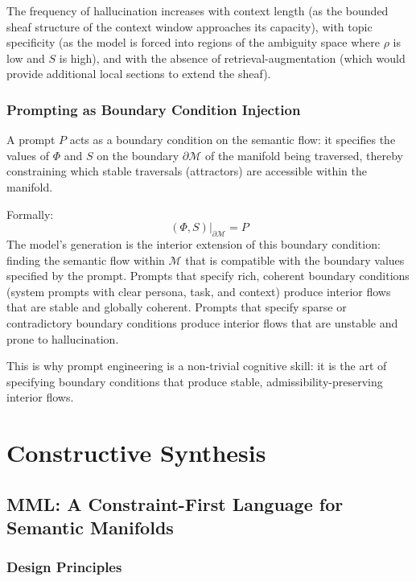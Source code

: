 \documentclass[12pt,oneside]{book}
\theoremstyle{plain}
\theoremstyle{definition}
\theoremstyle{plain}
\newcommand{\cM}{\mathcal{M}}
\begin{document}
The frequency of hallucination increases with context length (as the bounded sheaf structure of the context window approaches its capacity), with topic specificity (as the model is forced into regions of the ambiguity space where $\rho$ is low and $S$ is high), and with the absence of retrieval-augmentation (which would provide additional local sections to extend the sheaf).

\section{Prompting as Boundary Condition Injection}

A prompt $P$ acts as a boundary condition on the semantic flow: it specifies the values of $\Phi$ and $S$ on the boundary $\partial \cM$ of the manifold being traversed, thereby constraining which stable traversals (attractors) are accessible within the manifold.

Formally:
\[
(\Phi, S)\big|_{\partial \cM} = P
\]
The model's generation is the interior extension of this boundary condition: finding the semantic flow within $\cM$ that is compatible with the boundary values specified by the prompt. Prompts that specify rich, coherent boundary conditions (system prompts with clear persona, task, and context) produce interior flows that are stable and globally coherent. Prompts that specify sparse or contradictory boundary conditions produce interior flows that are unstable and prone to hallucination.

This is why prompt engineering is a non-trivial cognitive skill: it is the art of specifying boundary conditions that produce stable, admissibility-preserving interior flows.

\part{Constructive Synthesis}

\chapter{MML: A Constraint-First Language for Semantic Manifolds}
\label{ch:mml}

\section{Design Principles}
\end{document}
